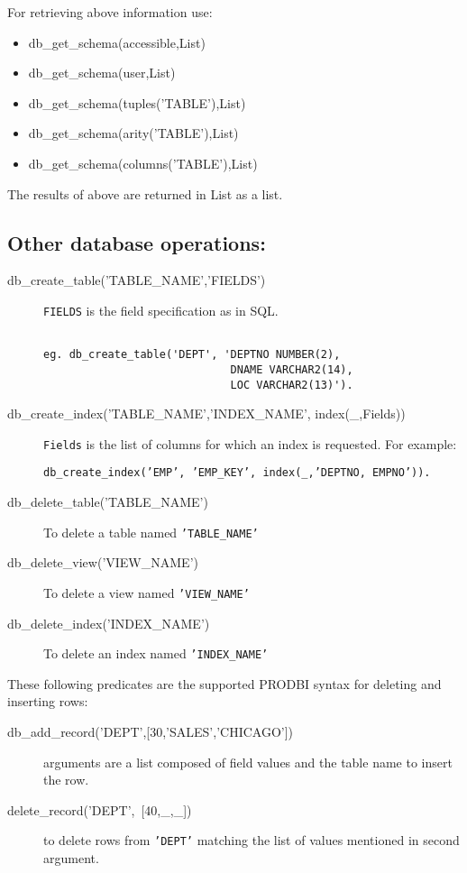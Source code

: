 For retrieving above information use:
\begin{itemize}

\item db\_get\_schema(accessible,List)
\item db\_get\_schema(user,List)
\item db\_get\_schema(tuples('TABLE'),List)
\item db\_get\_schema(arity('TABLE'),List)
\item db\_get\_schema(columns('TABLE'),List)
\end{itemize}

The results of above are returned in List as a list.


\subsection{Other database operations:}

\begin{description}

\item[db\_create\_table('TABLE\_NAME','FIELDS')]
	{\tt FIELDS} is the field specification as in SQL.
\begin{verbatim}

eg. db_create_table('DEPT', 'DEPTNO NUMBER(2),
                             DNAME VARCHAR2(14),
                             LOC VARCHAR2(13)').
\end{verbatim}


\item[db\_create\_index('TABLE\_NAME','INDEX\_NAME', index(\_,Fields))]
	{\tt Fields} is the list of columns for which an index
	is requested.  For example:
\begin{center}

{\tt db\_create\_index('EMP', 'EMP\_KEY', index(\_,'DEPTNO, EMPNO')).}
\end{center}

\item[db\_delete\_table('TABLE\_NAME')] To delete a table named {\tt 'TABLE\_NAME'}

\item[db\_delete\_view('VIEW\_NAME')] To delete a view named {\tt 'VIEW\_NAME'}

\item[db\_delete\_index('INDEX\_NAME')] To delete an index named {\tt 'INDEX\_NAME'}
\end{description}

These following predicates are the supported PRODBI syntax for deleting and inserting rows:
\begin{description}

\item[\mbox{db\_add\_record('DEPT',[30,'SALES','CHICAGO'])}]
	 arguments are a list composed of field values and the table name to
	 insert the row.

\item[\mbox{delete\_record('DEPT', [40,\_,\_])}]
	 to delete rows from {\tt 'DEPT'} matching the list of values mentioned in
	 second argument. 
\end{description}

